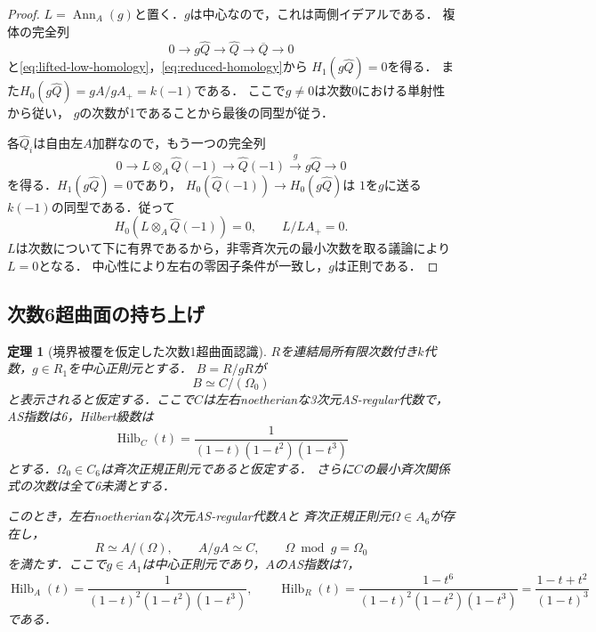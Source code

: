 \documentclass[11pt,a4paper]{ltjsarticle}
\newtheorem{theorem}{定理}[section]
\theoremstyle{definition}
\newcommand{\Ann}{\operatorname{Ann}}
\newcommand{\Hilb}{\operatorname{Hilb}}
\begin{document}
\begin{proof}
$L=\Ann_A(g)$と置く．$g$は中心なので，これは両側イデアルである．
複体の完全列
\[
 0\longrightarrow g\widehat Q\longrightarrow\widehat Q
 \longrightarrow\overline Q\longrightarrow0
\]
と\eqref{eq:lifted-low-homology}，\eqref{eq:reduced-homology}から
$H_1(g\widehat Q)=0$を得る．
また$H_0(g\widehat Q)=gA/gA_+=k(-1)$である．
ここで$g\ne0$は次数0における単射性から従い，
$g$の次数が1であることから最後の同型が従う．

各$\widehat Q_i$は自由左$A$加群なので，もう一つの完全列
\[
 0\longrightarrow L\otimes_A\widehat Q(-1)
 \longrightarrow\widehat Q(-1)
 \xrightarrow{\,g\,}g\widehat Q\longrightarrow0
\]
を得る．$H_1(g\widehat Q)=0$であり，
$H_0(\widehat Q(-1))\to H_0(g\widehat Q)$は
$1$を$g$に送る$k(-1)$の同型である．従って
\[
 H_0(L\otimes_A\widehat Q(-1))=0,
 \qquad L/LA_+=0.
\]
$L$は次数について下に有界であるから，非零斉次元の最小次数を取る議論により$L=0$となる．
中心性により左右の零因子条件が一致し，$g$は正則である．
\end{proof}

\subsection{次数6超曲面の持ち上げ}

\begin{theorem}[境界被覆を仮定した次数1超曲面認識]
\label{thm:weighted-hypersurface-recognition}
$R$を連結局所有限次数付き$k$代数，$g\in R_1$を中心正則元とする．
$B=R/gR$が
\begin{equation}\label{eq:boundary-cover}
 B\simeq C/(\Omega_0)
\end{equation}
と表示されると仮定する．ここで$C$は左右noetherianな3次元AS-regular代数で，
AS指数は6，Hilbert級数は
\[
 \Hilb_C(t)=\frac1{(1-t)(1-t^2)(1-t^3)}
\]
とする．$\Omega_0\in C_6$は斉次正規正則元であると仮定する．
さらに$C$の最小斉次関係式の次数は全て6未満とする．

このとき，左右noetherianな4次元AS-regular代数$A$と
斉次正規正則元$\Omega\in A_6$が存在し，
\begin{equation}\label{eq:recognized-hypersurface}
 R\simeq A/(\Omega),\qquad A/gA\simeq C,
 \qquad \Omega\bmod g=\Omega_0
\end{equation}
を満たす．ここで$g\in A_1$は中心正則元であり，$A$のAS指数は7，
\begin{equation}\label{eq:recognized-hilbert}
 \Hilb_A(t)=\frac1{(1-t)^2(1-t^2)(1-t^3)},\qquad
 \Hilb_R(t)=\frac{1-t^6}{(1-t)^2(1-t^2)(1-t^3)}
 =\frac{1-t+t^2}{(1-t)^3}
\end{equation}
である．
\end{theorem}
\end{document}
